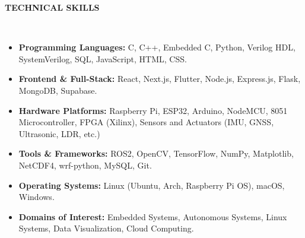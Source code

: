 \documentclass[10pt,a4paper]{article}
\newcommand{\resheading}[1]{{\small \colorbox{mygrey}{\begin{minipage}{0.99\textwidth}{\textbf{#1 \vphantom{p\^{E}}}}\end{minipage}}}}
\begin{document}
\noindent
\resheading{\textbf{TECHNICAL SKILLS}}\\[-0.4cm]
\begin{itemize}[noitemsep,nolistsep]

    \item \textbf{Programming Languages:} C, C++, Embedded C, Python, Verilog HDL, SystemVerilog, SQL, JavaScript, HTML, CSS.
    
    \item \textbf{Frontend \& Full-Stack:} React, Next.js, Flutter, Node.js, Express.js, Flask, MongoDB, Supabase.
    
    \item \textbf{Hardware Platforms:} Raspberry Pi, ESP32, Arduino, NodeMCU, 8051 Microcontroller, FPGA (Xilinx), Sensors and Actuators (IMU, GNSS, Ultrasonic, LDR, etc.)
    
    \item \textbf{Tools \& Frameworks:} ROS2, OpenCV, TensorFlow, NumPy, Matplotlib, NetCDF4, wrf-python, MySQL, Git.
    
    \item \textbf{Operating Systems:} Linux (Ubuntu, Arch, Raspberry Pi OS), macOS, Windows.
    
    \item \textbf{Domains of Interest:} Embedded Systems, Autonomous Systems, Linux Systems, Data Visualization, Cloud Computing.

\end{itemize}
\end{document}
